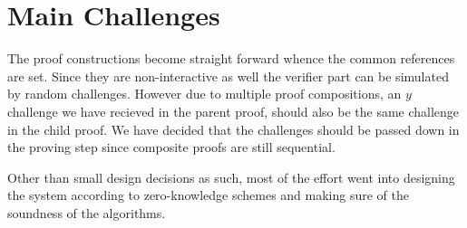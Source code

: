 \documentclass[12pt,a4paper]{report}
\begin{document}
\section{Main Challenges}
The proof constructions become straight forward whence the common references are set. 
Since they are non-interactive as well the verifier part can be simulated by random challenges.
However due to multiple proof compositions, an $y$ challenge we have recieved in the parent proof,
should also be the same challenge in the child proof. We have decided that the challenges should be passed down in the proving step since composite proofs are still sequential.\par
Other than small design decisions as such, most of the effort went into designing the system according to zero-knowledge schemes and making sure of the soundness of the algorithms.
\end{document}
